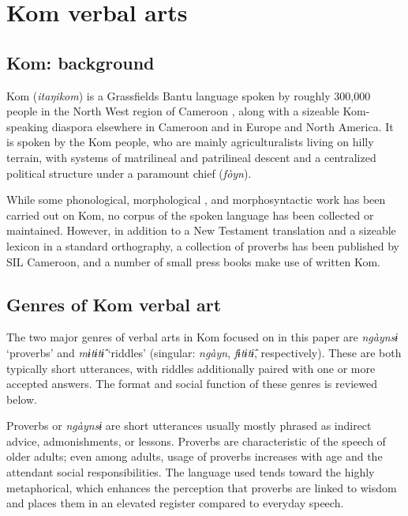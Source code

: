 \documentclass[output=paper,colorlinks,citecolor=brown
]{langscibook}
\begin{document}
\section{Kom verbal arts} \label{kom-background}

\subsection{Kom: background}

Kom (\textit{itaŋikom}) is a Grassfields Bantu language spoken by roughly 300,000 people in the North West region of Cameroon \citep{ethnologueFaytak, glottolog2023}, along with a sizeable Kom-speaking diaspora elsewhere in Cameroon and in Europe and North America. 
It is spoken by the Kom people, who are mainly agriculturalists living on hilly terrain, with systems of matrilineal and patrilineal descent and a centralized political structure under a paramount chief (\textit{fòyn}). 

While some phonological, morphological \citep{hyman1980babanki, hyman-augment, kiessling2010infix, akumbu2019noun, njuasi2022monophthongization}, and morphosyntactic \citep{chia1976kom, shultz1997kom, kawuldim2014relativization} work has been carried out on Kom, no corpus of the spoken language has been collected or maintained. 
However, in addition to a New Testament translation and a sizeable lexicon \citep{jones2001provisional} in a standard orthography, a collection of proverbs \citep{loh-timlini-i} has been published by SIL Cameroon, and a number of small press books make use of written Kom.

\subsection{Genres of Kom verbal art} %

The two major genres of verbal arts in Kom focused on in this paper are \textit{ngàynsɨ} `proverbs' and \textit{mɨtɨtɨ̂} `riddles' (singular: \textit{ngàyn}, \textit{fɨtɨtɨ̂}, respectively). These are both typically short utterances, with riddles additionally paired with one or more accepted answers. The format and social function of these genres is reviewed below. 

Proverbs or \textit{ngàynsɨ} are short utterances usually mostly phrased as indirect advice, admonishments, or lessons.
Proverbs are characteristic of the speech of older adults; even among adults, usage of proverbs increases with age and the attendant social responsibilities.
The language used tends toward the highly metaphorical, which enhances the perception that proverbs are linked to wisdom and places them in an elevated register compared to everyday speech. 
\end{document}
